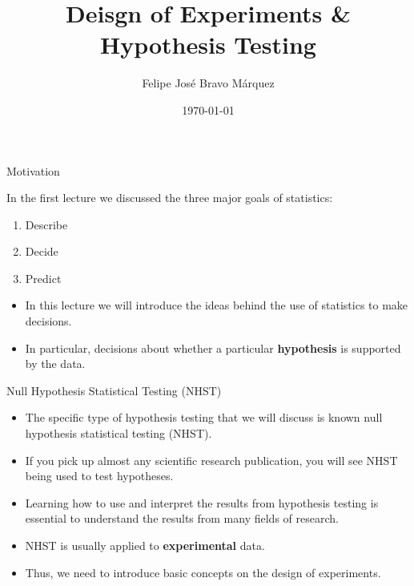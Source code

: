 \documentclass[handout]{beamer}
\title{Deisgn of Experiments \& Hypothesis Testing}
\author[Felipe Bravo Márquez]{\footnotesize
 \textcolor[rgb]{0.00,0.00,1.00}{Felipe José Bravo Márquez}}
\date{ \today }
\begin{document}
\begin{frame}
\titlepage


\end{frame}





\begin{frame}{Motivation}
\scriptsize{


In the first lecture we discussed the three major goals of statistics:
\begin{enumerate}
 \item Describe
 \item Decide
 \item Predict 
\end{enumerate}



 \begin{itemize}
  \item In this lecture we will introduce the ideas behind the use of statistics to make decisions.
  \item In particular, decisions about whether a particular \textbf{hypothesis} is supported by the data. \cite{poldrack2019statistical}
 \end{itemize}

} 
\end{frame}



\begin{frame}{Null Hypothesis Statistical Testing (NHST)}
\scriptsize{
\begin{itemize}
 \item The specific type of hypothesis testing that we will discuss is known null hypothesis statistical testing (NHST).
\item  If you pick up almost any scientific research publication, you will see NHST being used to test hypotheses.
\item Learning how to use and interpret the results from hypothesis testing is essential to understand the results from many fields of research.
\item NHST is usually applied to \textbf{experimental} data.
\item Thus, we need to introduce basic concepts on the design of experiments.
\end{itemize}



} 
\end{frame}
\end{document}
